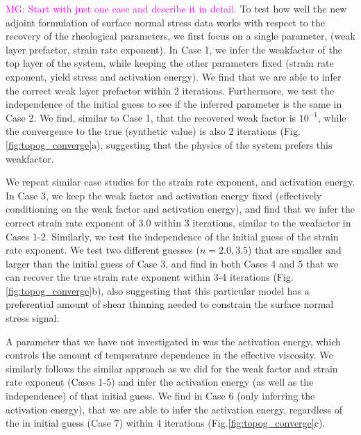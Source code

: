 \documentclass[12pt]{article}
\newcommand{\mgnote}[1]{\textcolor{magenta}{MG: #1}}
\begin{document}

\mgnote{Start with just one case and describe it in detail.}
To test how well the new adjoint formulation of surface normal stress data works with respect to the recovery of the rheological parameters, we first focus on a single parameter, (weak layer prefactor, strain rate exponent). In Case 1, we infer the weakfactor of the top layer of the system, while keeping the other parameters fixed (strain rate exponent, yield stress and activation energy). We find that we are able to infer the correct weak layer prefactor within 2 iterations. Furthermore, we test the independence of the initial guess to see if the inferred parameter is the same in Case 2. We find, similar to Case 1, that the recovered weak factor is $10^{-1}$, while the convergence to the true (synthetic value) is also 2 iterations (Fig.\ref{fig:topog_converge}a), suggesting that the physics of the system prefers this weakfactor.

We repeat similar case studies for the strain rate exponent, and activation energy. In Case 3, we keep the weak factor and activation energy fixed (effectively conditioning on the weak factor and activation energy), and find that we infer the correct strain rate exponent of 3.0 within 3 iterations, similar to the weafactor in Cases 1-2. Similarly, we test the independence of the initial guess of the strain rate exponent. We test two different guesses ($n=2.0,3.5$) that are smaller and larger than the initial guess of Case 3, and find in both Cases 4 and 5 that we can recover the true strain rate exponent within 3-4 iterations (Fig.\ref{fig:topog_converge}b), also suggesting that this particular model has a preferential amount of shear thinning needed to constrain the surface normal stress signal.

A parameter that we have not investigated in \citep{ratnaswamy2015adjoint} was the activation energy, which controls the amount of temperature dependence in the effective viscosity. We similarly follows the similar approach as we did for the weak factor and strain rate exponent (Cases 1-5) and infer the activation energy (as well as the independence) of that initial guess. We find in Case 6 (only inferring the activation energy), that  we are able to infer the activation energy, regardless of the in initial guess (Case 7) within 4 iterations (Fig.\ref{fig:topog_converge}c). 
\end{document}
